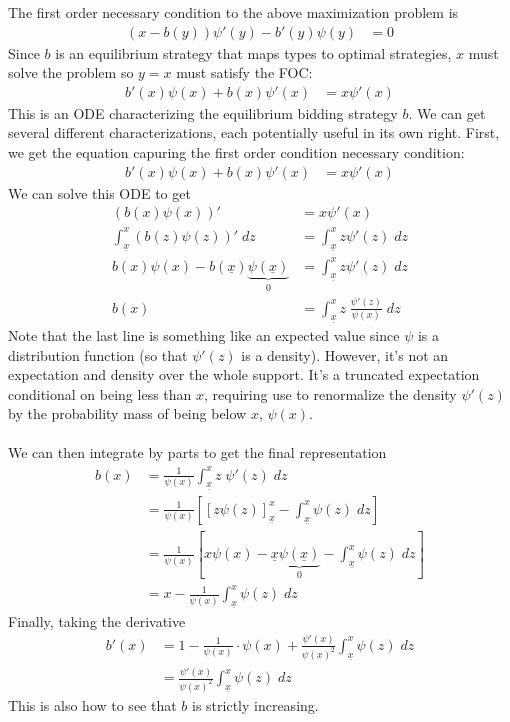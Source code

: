 \documentclass[12pt]{article}
\theoremstyle{plain}
\theoremstyle{definition}
\theoremstyle{remark}
\begin{document}
The first order necessary condition to the above maximization problem is
\begin{align*}
  (x-b(y))\psi'(y) -b'(y) \psi(y) &= 0
\end{align*}
Since $b$ is an equilibrium strategy that maps types to optimal
strategies, $x$ must solve the problem so $y=x$ must satisfy the FOC:
\begin{align*}
  b'(x) \psi(x) + b(x)\psi'(x) &= x\psi'(x)
\end{align*}
This is an ODE characterizing the equilibrium bidding strategy $b$.
We can get several different characterizations, each potentially useful
in its own right. First, we get the equation capuring the first order
condition necessary condition:
\begin{align*}
  b'(x) \psi(x) + b(x)\psi'(x) &= x\psi'(x)
\end{align*}
We can solve this ODE to get
\begin{align*}
  \left(b(x) \psi(x)\right)' &= x\psi'(x)\\
  \int^x_{\underline{x}}
  \left(b(z) \psi(z)\right)'\; dz
  &=
  \int^x_{\underline{x}}
  z\psi'(z)\; dz\\
  b(x) \psi(x)
  -
  b(\underline{x}) \underbrace{\psi(\underline{x})}_{0}
  &=
  \int^x_{\underline{x}}
  z\psi'(z)\; dz\\
  b(x)
  &=
  \int^x_{\underline{x}}
  z \; \frac{\psi'(z)}{\psi(x)}\; dz
\end{align*}
Note that the last line is something like an expected value since $\psi$
is a distribution function (so that $\psi'(z)$ is a density). However,
it's not an expectation and density over the whole support. It's a
truncated expectation conditional on being less than $x$, requiring use
to renormalize the density $\psi'(z)$ by the probability mass of being
below $x$, $\psi(x)$.
\\
\\
We can then integrate by parts to get the final representation
\begin{align*}
  b(x)
  &=
  \frac{1}{\psi(x)}
  \int^x_{\underline{x}}
  z \; \psi'(z)\;dz \\
  &=
  \frac{1}{\psi(x)}
  \left[
    [z\psi(z)]^x_{\underline{x}}
    -
    \int^x_{\underline{x}}
    \psi(z)\;dz
  \right] \\
  &=
  \frac{1}{\psi(x)}
  \left[
    x\psi(x)
    -
    \underline{x} \underbrace{\psi(\underline{x})}_{0}
    -
    \int^x_{\underline{x}}
    \psi(z)\;dz
  \right] \\
  &=
    x -
    \frac{1}{\psi(x)}
    \int^x_{\underline{x}}
    \psi(z)\;dz
\end{align*}
Finally, taking the derivative
\begin{align*}
  b'(x)
  &=
    1 -
    \frac{1}{\psi(x)}
    \cdot
    \psi(x)
    +
    \frac{\psi'(x)}{\psi(x)^{2}}
    \int^x_{\underline{x}}
    \psi(z)\;dz \\
  &=
    \frac{\psi'(x)}{\psi(x)^{2}}
    \int^x_{\underline{x}}
    \psi(z)\;dz
\end{align*}
This is also how to see that $b$ is strictly increasing.





\end{document}
